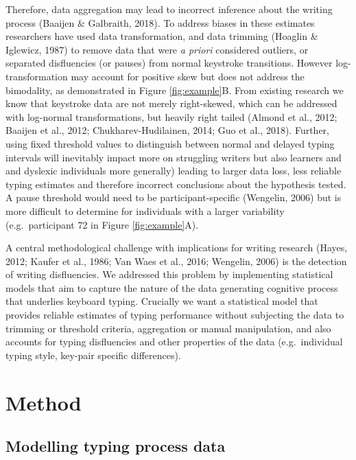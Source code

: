 \documentclass[
  english,
  man,mask,floatsintext]{apa7}
\begin{document}
Therefore, data aggregation may lead to incorrect inference about the writing process (Baaijen \& Galbraith, 2018). To address biases in these estimates researchers have used data transformation, and data trimming (Hoaglin \& Iglewicz, 1987) to remove data that were \emph{a priori} considered outliers, or separated disfluencies (or pauses) from normal keystroke transitions. However log-transformation may account for positive skew but does not address the bimodality, as demonstrated in Figure \ref{fig:example}B. From existing research we know that keystroke data are not merely right-skewed, which can be addressed with log-normal transformations, but heavily right tailed (Almond et al., 2012; Baaijen et al., 2012; Chukharev-Hudilainen, 2014; Guo et al., 2018). Further, using fixed threshold values to distinguish between normal and delayed typing intervals will inevitably impact more on struggling writers but also learners and and dyslexic individuals more generally) leading to larger data loss, less reliable typing estimates and therefore incorrect conclusions about the hypothesis tested. A pause threshold would need to be participant-specific (Wengelin, 2006) but is more difficult to determine for individuals with a larger variability (e.g.~participant 72 in Figure \ref{fig:example}A).

A central methodological challenge with implications for writing research (Hayes, 2012; Kaufer et al., 1986; Van Waes et al., 2016; Wengelin, 2006) is the detection of writing disfluencies. We addressed this problem by implementing statistical models that aim to capture the nature of the data generating cognitive process that underlies keyboard typing. Crucially we want a statistical model that provides reliable estimates of typing performance without subjecting the data to trimming or threshold criteria, aggregation or manual manipulation, and also accounts for typing disfluencies and other properties of the data (e.g.~individual typing style, key-pair specific differences).

\hypertarget{method}{%
\section{Method}\label{method}}

\hypertarget{modelling-typing-process-data}{%
\subsection{Modelling typing process data}\label{modelling-typing-process-data}}
\end{document}
